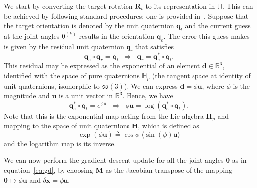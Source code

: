 We start by converting the target rotation $\bm{R}_t$ to its representation in 
$\mathbb{H}$. This can be achieved by following standard procedures; one is 
provided in~\cite{quaternion}. Suppose that the target orientation is denoted by
the unit quaternion $\bm{q}_t$ and the current guess at the joint angles 
$\bm{\theta}^{(k)}$ results in the orientation $\bm{q}_e$. The error this guess
makes is given by the residual unit quaternion $\bm{q}_r$ that satisfies
%
\[
\bm{q}_e \circ \bm{q}_r = \bm{q}_t \;\; \Rightarrow \;\; \bm{q}_r = \bm{q}_e^* \circ \bm{q}_t.
\]
%
This residual may be expressed as the exponential of an element $\bm{d} \in
\mathbb{R}^3$, identified with the space of pure quaternions $\mathbb{H}_p$ (the
tangent space at identity of unit quaternions, isomorphic to
$\mathfrak{so}(3)$). We can express $\bm{d} = \phi \bm{u}$, where $\phi$ is the magnitude and $\bm{u}$ is a unit vector in $\mathbb{R}^3$. Hence, we have 
\[\bm{q}_e^* \circ \bm{q}_t = e^{\phi \bm{u}} \;\; \Rightarrow \;\; \phi \bm{u} =
\log{\left(\bm{q}_e^* \circ \bm{q}_t\right)}. \]
%
Note that this is the exponential map acting from the Lie algebra $\bm{H}_p$ 
and mapping to the space of unit quaternions $\bm{H}$, which is defined as 
\[
\exp\left(\phi \bm{u} \right) \triangleq \cos{\phi}\; \langle \sin{(\phi)} \bm{u} \rangle
\]
%
and the logarithm map is its inverse.

We can now perform the gradient descent update for all the joint angles
$\bm{\theta}$ as in equation~\eqref{eq:gd}, by choosing $\bm{M}$ as the Jacobian
transpose of the mapping $\bm{\theta} \mapsto \phi \bm{u}$ and $\delta \bm{x} = 
\phi \bm{u}$.